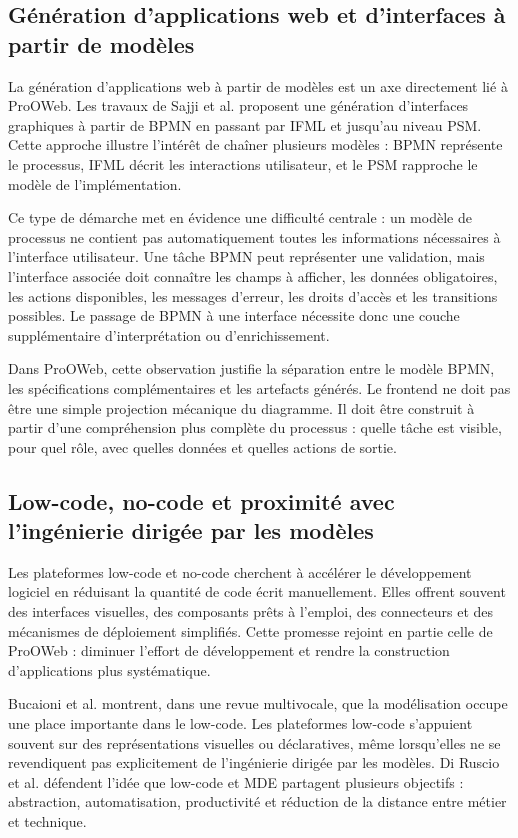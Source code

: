\documentclass[12pt,a4paper]{article}
\begin{document}
\subsection{Génération d'applications web et d'interfaces à partir de modèles}

La génération d'applications web à partir de modèles est un axe directement lié à ProOWeb. Les travaux de Sajji et al. \cite{sajji2023} proposent une génération d'interfaces graphiques à partir de BPMN en passant par IFML et jusqu'au niveau PSM. Cette approche illustre l'intérêt de chaîner plusieurs modèles : BPMN représente le processus, IFML décrit les interactions utilisateur, et le PSM rapproche le modèle de l'implémentation.

Ce type de démarche met en évidence une difficulté centrale : un modèle de processus ne contient pas automatiquement toutes les informations nécessaires à l'interface utilisateur. Une tâche BPMN peut représenter une validation, mais l'interface associée doit connaître les champs à afficher, les données obligatoires, les actions disponibles, les messages d'erreur, les droits d'accès et les transitions possibles. Le passage de BPMN à une interface nécessite donc une couche supplémentaire d'interprétation ou d'enrichissement.

Dans ProOWeb, cette observation justifie la séparation entre le modèle BPMN, les spécifications complémentaires et les artefacts générés. Le frontend ne doit pas être une simple projection mécanique du diagramme. Il doit être construit à partir d'une compréhension plus complète du processus : quelle tâche est visible, pour quel rôle, avec quelles données et quelles actions de sortie.

\subsection{Low-code, no-code et proximité avec l'ingénierie dirigée par les modèles}

Les plateformes low-code et no-code cherchent à accélérer le développement logiciel en réduisant la quantité de code écrit manuellement. Elles offrent souvent des interfaces visuelles, des composants prêts à l'emploi, des connecteurs et des mécanismes de déploiement simplifiés. Cette promesse rejoint en partie celle de ProOWeb : diminuer l'effort de développement et rendre la construction d'applications plus systématique.

Bucaioni et al. \cite{bucaioni2022} montrent, dans une revue multivocale, que la modélisation occupe une place importante dans le low-code. Les plateformes low-code s'appuient souvent sur des représentations visuelles ou déclaratives, même lorsqu'elles ne se revendiquent pas explicitement de l'ingénierie dirigée par les modèles. Di Ruscio et al. \cite{diruscio2022} défendent l'idée que low-code et MDE partagent plusieurs objectifs : abstraction, automatisation, productivité et réduction de la distance entre métier et technique.
\end{document}
